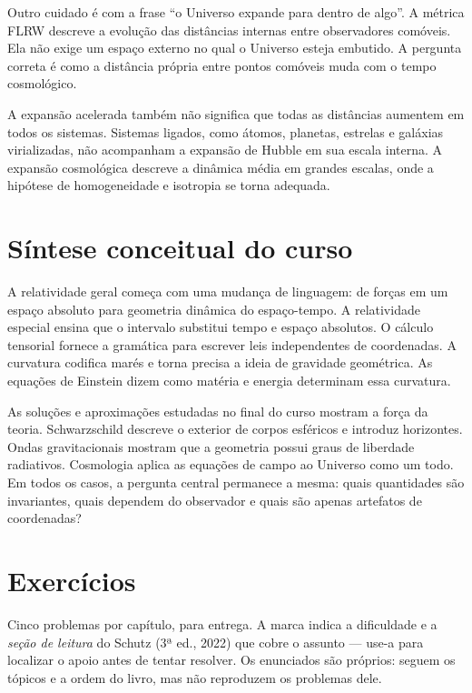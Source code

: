\documentclass[12pt,a4paper,oneside]{book}
\theoremstyle{rgplain}
\theoremstyle{rgremark}
\begin{document}
Outro cuidado é com a frase ``o Universo expande para dentro de algo''. A
métrica FLRW descreve a evolução das distâncias internas entre observadores
comóveis. Ela não exige um espaço externo no qual o Universo esteja embutido.
A pergunta correta é como a distância própria entre pontos comóveis muda com o
tempo cosmológico.

A expansão acelerada também não significa que todas as distâncias aumentem em
todos os sistemas. Sistemas ligados, como átomos, planetas, estrelas e
galáxias virializadas, não acompanham a expansão de Hubble em sua escala
interna. A expansão cosmológica descreve a dinâmica média em grandes escalas,
onde a hipótese de homogeneidade e isotropia se torna adequada.

\section{Síntese conceitual do curso}

A relatividade geral começa com uma mudança de linguagem: de forças em um
espaço absoluto para geometria dinâmica do espaço-tempo. A relatividade
especial ensina que o intervalo substitui tempo e espaço absolutos. O cálculo
tensorial fornece a gramática para escrever leis independentes de coordenadas.
A curvatura codifica marés e torna precisa a ideia de gravidade geométrica.
As equações de Einstein dizem como matéria e energia determinam essa curvatura.

As soluções e aproximações estudadas no final do curso mostram a força da
teoria. Schwarzschild descreve o exterior de corpos esféricos e introduz
horizontes. Ondas gravitacionais mostram que a geometria possui graus de
liberdade radiativos. Cosmologia aplica as equações de campo ao Universo como
um todo. Em todos os casos, a pergunta central permanece a mesma: quais
quantidades são invariantes, quais dependem do observador e quais são apenas
artefatos de coordenadas?

\clearpage


\clearpage
\section{Exercícios}
\begin{leitura}
Cinco problemas por capítulo, para entrega. A marca indica a dificuldade e a \emph{seção de leitura} do Schutz (3ª ed., 2022) que cobre o assunto --- use-a para localizar o apoio antes de tentar resolver. Os enunciados são próprios: seguem os tópicos e a ordem do livro, mas não reproduzem os problemas dele.
\end{leitura}
\end{document}

